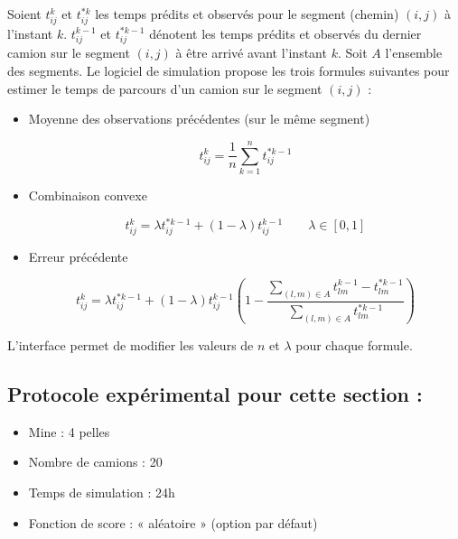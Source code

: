 \documentclass[letterpaper,12pt]{article}
\begin{document}
	
	Soient $t_{ij}^k$ et $t^{*k}_{ij}$ les temps prédits et observés pour le segment (chemin) $(i,j)$ à l'instant $k$. $t_{ij}^{k-1}$ et $t^{*k-1}_{ij}$ dénotent les temps prédits et observés du dernier camion sur le segment $(i, j)$ à être arrivé avant l'instant $k$. Soit $A$ l'ensemble des segments. Le logiciel de simulation propose les trois formules suivantes pour estimer le temps de parcours d’un camion sur le segment $(i,j)$ : 
	
	
	\begin{itemize}
		
		\item Moyenne des observations précédentes (sur le même segment)
		
		\begin{equation}
		t_{ij}^k = \frac{1}{n} \sum\limits_{k=1}^n t_{ij}^{*k-1}
		\end{equation}
		
		\item Combinaison convexe
		
		\begin{equation}
		t_{ij}^k = \lambda t^{*k-1}_{ij} + (1-\lambda) t_{ij}^{k-1} \qquad \lambda \in [0, 1]
		\end{equation}
		
		\item Erreur précédente
		
		\begin{equation}
		t_{ij}^k = \lambda t^{*k-1}_{ij} + (1-\lambda) t_{ij}^{k-1} \left( 1- \frac{\sum\limits_{(l,m) \in A} t_{lm}^{k-1} - t_{lm}^{*k-1}}{\sum\limits_{(l,m) \in A} t_{lm}^{*k-1}}\right)
		\end{equation}
		
		
	\end{itemize}
	
	L'interface permet de modifier les valeurs de $n$ et $\lambda$ pour chaque formule.
	
	\subsection*{Protocole expérimental pour cette section : }
	
	\begin{itemize}
		\item Mine : 4 pelles
		\item Nombre de camions : 20
		\item Temps de simulation : 24h
		\item Fonction de score : « aléatoire » (option par défaut)
	\end{itemize}
	
\end{document}
